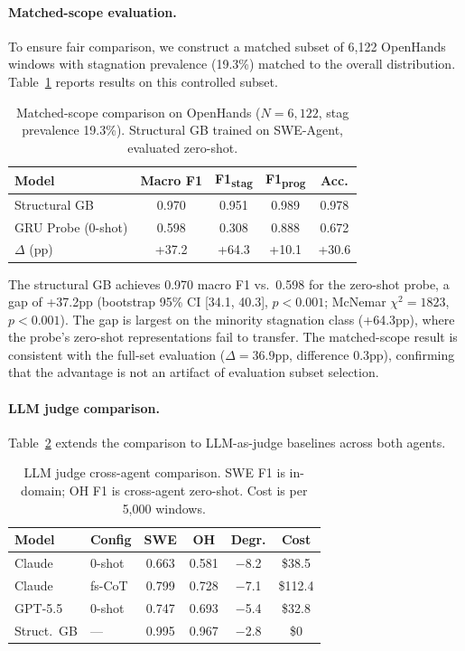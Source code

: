 \documentclass[11pt,a4paper]{article}
\begin{document}
\paragraph{Matched-scope evaluation.}
To ensure fair comparison, we construct a matched subset of 6,122 OpenHands windows with stagnation prevalence (19.3\%) matched to the overall distribution. Table~\ref{tab:matched} reports results on this controlled subset.

\begin{table}[t]
\centering
\small
\caption{Matched-scope comparison on OpenHands ($N{=}6{,}122$, stag prevalence 19.3\%). Structural GB trained on SWE-Agent, evaluated zero-shot.}
\label{tab:matched}
\begin{tabular}{lcccc}
\toprule
\textbf{Model} & \textbf{Macro F1} & \textbf{F1\textsubscript{stag}} & \textbf{F1\textsubscript{prog}} & \textbf{Acc.} \\
\midrule
Structural GB & 0.970 & 0.951 & 0.989 & 0.978 \\
GRU Probe (0-shot) & 0.598 & 0.308 & 0.888 & 0.672 \\
\midrule
$\Delta$ (pp) & +37.2 & +64.3 & +10.1 & +30.6 \\
\bottomrule
\end{tabular}
\vspace{-2mm}
\end{table}

The structural GB achieves 0.970 macro F1 vs.\ 0.598 for the zero-shot probe, a gap of +37.2pp (bootstrap 95\% CI [34.1, 40.3], $p{<}0.001$; McNemar $\chi^2{=}1823$, $p{<}0.001$). The gap is largest on the minority stagnation class (+64.3pp), where the probe's zero-shot representations fail to transfer. The matched-scope result is consistent with the full-set evaluation ($\Delta{=}36.9$pp, difference 0.3pp), confirming that the advantage is not an artifact of evaluation subset selection.

\paragraph{LLM judge comparison.}
Table~\ref{tab:llm} extends the comparison to LLM-as-judge baselines across both agents.

\begin{table}[t]
\centering
\small
\caption{LLM judge cross-agent comparison. SWE F1 is in-domain; OH F1 is cross-agent zero-shot. Cost is per 5,000 windows.}
\label{tab:llm}
\begin{tabular}{llcccc}
\toprule
\textbf{Model} & \textbf{Config} & \textbf{SWE} & \textbf{OH} & \textbf{Degr.} & \textbf{Cost} \\
\midrule
Claude & 0-shot & 0.663 & 0.581 & $-$8.2 & \$38.5 \\
Claude & fs-CoT & 0.799 & 0.728 & $-$7.1 & \$112.4 \\
GPT-5.5 & 0-shot & 0.747 & 0.693 & $-$5.4 & \$32.8 \\
\midrule
Struct.\ GB & --- & 0.995 & 0.967 & $-$2.8 & \$0 \\
\bottomrule
\end{tabular}
\vspace{-2mm}
\end{table}
\end{document}
